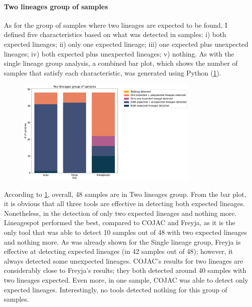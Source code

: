                 
            \paragraph{Two lineages group of samples}
            As for the group of samples where two lineages are expected to be found, I defined five characteristics based on what was detected in samples: i) both expected lineages; ii) only one expected lineage; iii) one expected plus unexpected lineages; iv) both expected plus unexpected lineages; v) nothing. As with the single lineage group analysis, a combined bar plot, which shows the number of samples that satisfy each characteristic, was generated using Python (\cref{fig:results:mock:bar-twolin}). 
            \begin{figure}[ht!]
                \centering
                \includegraphics[width=0.8\textwidth]{figures/results/mock/twolin-num-bars.png}
                \label{fig:results:mock:bar-twolin}
            \end{figure}
            
                According to \cref{fig:results:mock:bar-twolin}, overall, 48 samples are in Two lineages group. From the bar plot, it is obvious that all three tools are effective in detecting both expected lineages. Nonetheless, in the detection of only two expected lineages and nothing more. Lineagespot performed the best, compared to COJAC and Freyja, as it is the only tool that was able to detect 10 samples out of 48 with two expected lineages and nothing more. As was already shown for the Single lineage group, Freyja is effective at detecting expected lineages (in 42 samples out of 48); however, it always detected some unexpected lineages. COJAC's results for two lineages are considerably close to Freyja's results; they both detected around 40 samples with two lineages expected. Even more, in one sample, COJAC was able to detect only expected lineages. Interestingly, no tools detected nothing for this group of samples.

